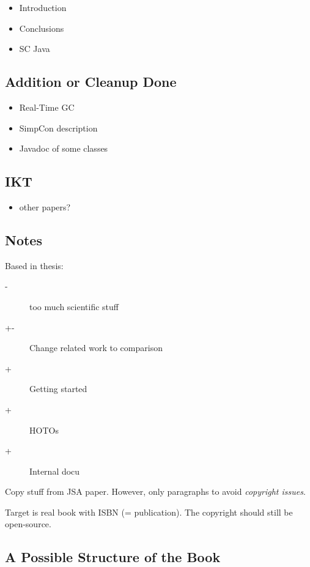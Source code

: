 \begin{itemize}
    \item Introduction
    \item Conclusions
    \item SC Java
\end{itemize}

\subsection{Addition or Cleanup Done}

\begin{itemize}
    \item Real-Time GC
    \item SimpCon description
    \item Javadoc of some classes
\end{itemize}

\subsection{IKT}

\begin{itemize}
    \item other papers?
\end{itemize}
\subsection{Notes}

Based in thesis:
\begin{description}
    \item[-] too much scientific stuff
    \item[+-] Change related work to comparison
    \item[+] Getting started
    \item[+] HOTOs
    \item[+] Internal docu
\end{description}

Copy stuff from JSA paper. However, only paragraphs to avoid
\emph{copyright issues}.

Target is real book with ISBN (= publication). The copyright should
still be open-source.

\subsection{A Possible Structure of the Book}

